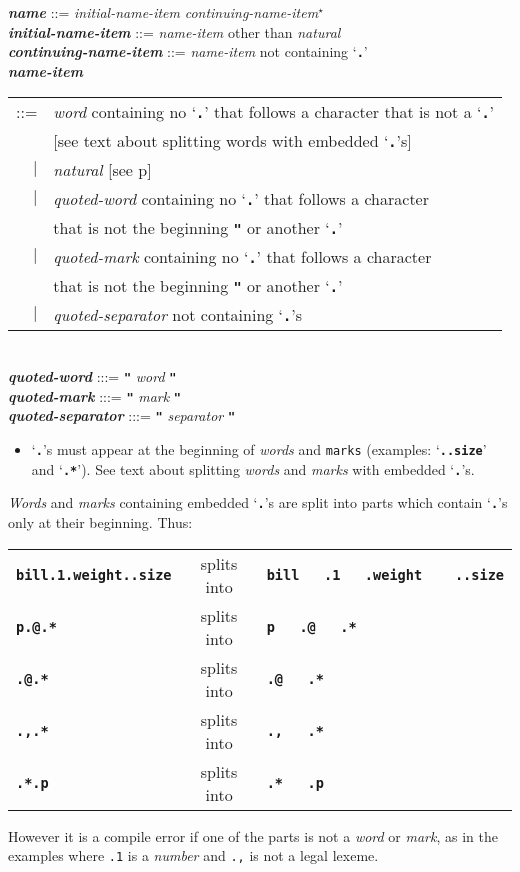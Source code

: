 \documentclass[12pt]{article}
\newcommand{\TT}[1]{{\tt \bfseries #1}}
\newcommand{\STAR}{{\Large $^\star$}}
\newcommand{\emkey}[1]{{\em \bfseries #1}}
\newcommand{\pagref}[1]{p\pageref{#1}}
\newenvironment{indpar}[1][0.3in]%
	{\begin{list}{}%
		     {\setlength{\itemsep}{0in}%
		      \setlength{\topsep}{0in}%
		      \setlength{\parsep}{1ex}%
		      \setlength{\labelwidth}{#1}%
		      \setlength{\leftmargin}{#1}%
		      \addtolength{\leftmargin}{\labelsep}}%
	 \item}%
	{\end{list}}
\begin{document}
\begin{indpar}
\emkey{name}\label{NAME} ::=
    {\em initial-name-item} {\em continuing-name-item}\STAR{} \\
\emkey{initial-name-item} ::= {\em name-item} other than {\em natural} \\
\emkey{continuing-name-item} ::= {\em name-item} not containing `\TT{.}' \\
\emkey{name-item}\label{NAME-ITEM}
    \begin{tabular}[t]{@{}rl}
    ::= & {\em word} containing no `\TT{.}' that follows a character
                     that is not a `\TT{.}' \\
        & [see text about splitting words with embedded `\TT{.}'s] \\
    $|$ & {\em natural} [see \pagref{LEXEME-TYPE-CONVERSION}] \\
    $|$ & {\em quoted-word} containing no `\TT{.}' that follows a character \\
        & that is not the beginning \TT{"} or another `\TT{.}' \\
    $|$ & {\em quoted-mark} containing no `\TT{.}' that follows a character \\
        & that is not the beginning \TT{"} or another `\TT{.}' \\
    $|$ & {\em quoted-separator} not containing `\TT{.}'s \\
    \end{tabular} \\
\emkey{quoted-word} :::= \TT{"} {\em word} \TT{"} \\
\emkey{quoted-mark} :::= \TT{"} {\em mark} \TT{"} \\
\emkey{quoted-separator} :::= \TT{"} {\em separator} \TT{"}

\begin{itemize}
\item `\TT{.}'s must appear at the beginning of {\em words}
and {\tt marks} (examples: `\TT{..size}' and `\TT{.*}').
See text about splitting {\em words} and {\em marks}
with embedded `\TT{.}'s.
\end{itemize}
\end{indpar}

{\em Words} and {\em marks} containing embedded `\TT{.}'s are split into
parts which contain `\TT{.}'s only at their beginning.
Thus:
\begin{center}
\begin{tabular}{lcl}
\TT{bill.1.weight..size} & splits into & \TT{bill~~~.1~~~.weight~~~~..size} \\
\TT{p.@.*}               & splits into & \TT{p~~~.@~~~.*} \\
\TT{.@.*}               & splits into & \TT{.@~~~.*} \\
\TT{.,.*}               & splits into & \TT{.,~~~.*} \\
\TT{.*.p}               & splits into & \TT{.*~~~.p} \\
\end{tabular}
\end{center}
However it is a compile error if one of the parts is not a {\em word}
or {\em mark}, as in the examples where {\tt .1} is a {\em number} and
{\tt .,} is not a legal lexeme.
\end{document}
